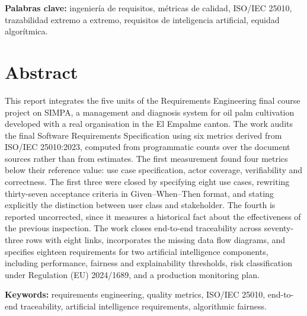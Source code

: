 \documentclass[11pt,letterpaper]{article}
\begin{document}
\vspace{0.3cm}
\noindent\textbf{Palabras clave:} ingeniería de requisitos, métricas de calidad, ISO/IEC 25010,
trazabilidad extremo a extremo, requisitos de inteligencia artificial, equidad algorítmica.

\vspace{0.8cm}
\section*{Abstract}

This report integrates the five units of the Requirements Engineering final course project on SIMPA,
a management and diagnosis system for oil palm cultivation developed with a real organisation in the
El Empalme canton. The work audits the final Software Requirements Specification using six metrics
derived from ISO/IEC 25010:2023, computed from programmatic counts over the document sources rather
than from estimates. The first measurement found four metrics below their reference value: use case
specification, actor coverage, verifiability and correctness. The first three were closed by
specifying eight use cases, rewriting thirty-seven acceptance criteria in Given--When--Then format,
and stating explicitly the distinction between user class and stakeholder. The fourth is reported
uncorrected, since it measures a historical fact about the effectiveness of the previous inspection.
The work closes end-to-end traceability across seventy-three rows with eight links, incorporates the
missing data flow diagrams, and specifies eighteen requirements for two artificial intelligence
components, including performance, fairness and explainability thresholds, risk classification under
Regulation (EU) 2024/1689, and a production monitoring plan.

\vspace{0.3cm}
\noindent\textbf{Keywords:} requirements engineering, quality metrics, ISO/IEC 25010, end-to-end
traceability, artificial intelligence requirements, algorithmic fairness.

\newpage

\tableofcontents
\newpage
\listoftables
{}
\listoffigures
{}
\newpage











\end{document}
